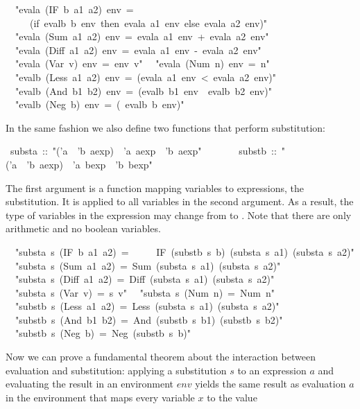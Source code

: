 \begin{isabelle}
\isanewline
\ \ {"}evala\ (IF\ b\ a1\ a2)\ env\ =\isanewline
\ \ \ \ \ (if\ evalb\ b\ env\ then\ evala\ a1\ env\ else\ evala\ a2\ env){"}\isanewline
\ \ {"}evala\ (Sum\ a1\ a2)\ env\ =\ evala\ a1\ env\ +\ evala\ a2\ env{"}\isanewline
\ \ {"}evala\ (Diff\ a1\ a2)\ env\ =\ evala\ a1\ env\ -\ evala\ a2\ env{"}\isanewline
\ \ {"}evala\ (Var\ v)\ env\ =\ env\ v{"}\isanewline
\ \ {"}evala\ (Num\ n)\ env\ =\ n{"}\isanewline
\isanewline
\ \ {"}evalb\ (Less\ a1\ a2)\ env\ =\ (evala\ a1\ env\ <\ evala\ a2\ env){"}\isanewline
\ \ {"}evalb\ (And\ b1\ b2)\ env\ =\ (evalb\ b1\ env\ {\isasymand}\ evalb\ b2\ env){"}\isanewline
\ \ {"}evalb\ (Neg\ b)\ env\ =\ ({\isasymnot}\ evalb\ b\ env){"}%
\begin{isamarkuptext}%
\noindent
In the same fashion we also define two functions that perform substitution:%
\end{isamarkuptext}%
\ substa\ ::\ {"}('a\ {\isasymRightarrow}\ 'b\ aexp)\ {\isasymRightarrow}\ 'a\ aexp\ {\isasymRightarrow}\ 'b\ aexp{"}\isanewline
\ \ \ \ \ \ \ substb\ ::\ {"}('a\ {\isasymRightarrow}\ 'b\ aexp)\ {\isasymRightarrow}\ 'a\ bexp\ {\isasymRightarrow}\ 'b\ bexp{"}%
\begin{isamarkuptext}%
\noindent
The first argument is a function mapping variables to expressions, the
substitution. It is applied to all variables in the second argument. As a
result, the type of variables in the expression may change from 
to . Note that there are only arithmetic and no boolean variables.%
\end{isamarkuptext}%
\isanewline
\ \ {"}substa\ s\ (IF\ b\ a1\ a2)\ =\isanewline
\ \ \ \ \ IF\ (substb\ s\ b)\ (substa\ s\ a1)\ (substa\ s\ a2){"}\isanewline
\ \ {"}substa\ s\ (Sum\ a1\ a2)\ =\ Sum\ (substa\ s\ a1)\ (substa\ s\ a2){"}\isanewline
\ \ {"}substa\ s\ (Diff\ a1\ a2)\ =\ Diff\ (substa\ s\ a1)\ (substa\ s\ a2){"}\isanewline
\ \ {"}substa\ s\ (Var\ v)\ =\ s\ v{"}\isanewline
\ \ {"}substa\ s\ (Num\ n)\ =\ Num\ n{"}\isanewline
\isanewline
\ \ {"}substb\ s\ (Less\ a1\ a2)\ =\ Less\ (substa\ s\ a1)\ (substa\ s\ a2){"}\isanewline
\ \ {"}substb\ s\ (And\ b1\ b2)\ =\ And\ (substb\ s\ b1)\ (substb\ s\ b2){"}\isanewline
\ \ {"}substb\ s\ (Neg\ b)\ =\ Neg\ (substb\ s\ b){"}%
\begin{isamarkuptext}%
Now we can prove a fundamental theorem about the interaction between
evaluation and substitution: applying a substitution $s$ to an expression $a$
and evaluating the result in an environment $env$ yields the same result as
evaluation $a$ in the environment that maps every variable $x$ to the value

\end{isamarkuptext}
\end{isabelle}
